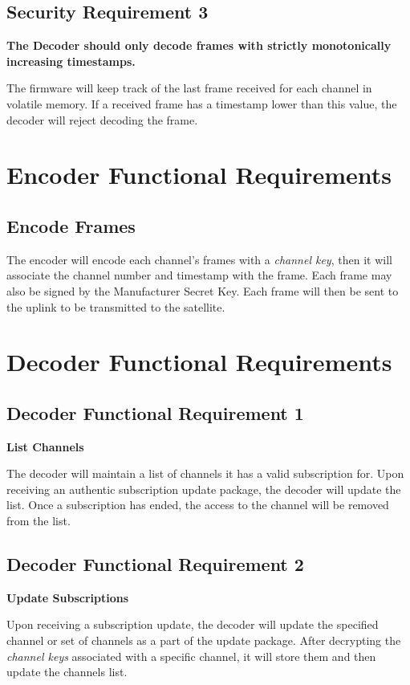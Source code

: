 \documentclass[12pt]{article}
\begin{document}
\begin{itemize}
\subsection*{Security Requirement 3}
\textbf{The Decoder should only decode frames with strictly monotonically increasing timestamps.}

The firmware will keep track of the last frame received for each channel in volatile memory. If a received frame has a timestamp lower than this value, the decoder will reject decoding the frame.

\newpage
\section*{Encoder Functional Requirements}

\subsection*{Encode Frames}
The encoder will encode each channel's frames with a \textit{channel key}, then it will associate the channel number and timestamp with the frame. Each frame may also be signed by the Manufacturer Secret Key. Each frame will then be sent to the uplink to be transmitted to the satellite.

\section*{Decoder Functional Requirements}

\subsection*{Decoder Functional Requirement 1}
\textbf{List Channels}

The decoder will maintain a list of channels it has a valid subscription for. Upon receiving an authentic subscription update package, the decoder will update the list. Once a subscription has ended, the access to the channel will be removed from the list.

\subsection*{Decoder Functional Requirement 2}
\textbf{Update Subscriptions}

Upon receiving a subscription update, the decoder will update the specified channel or set of channels as a part of the update package. After decrypting the \textit{channel keys} associated with a specific channel, it will store them and then update the channels list.


\end{itemize}
\end{document}
